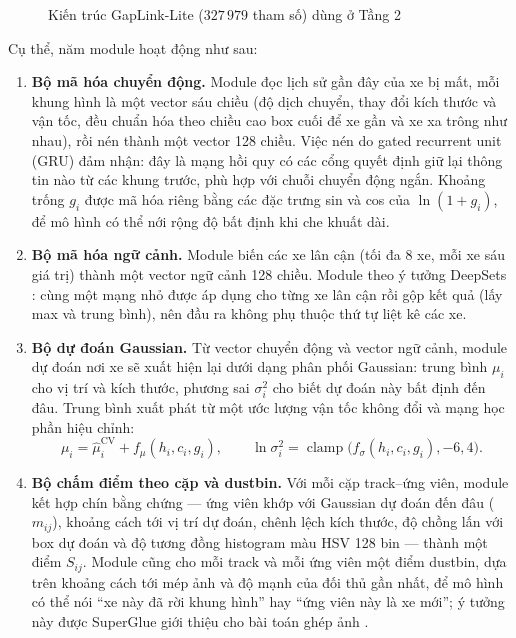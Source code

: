 \begin{figure}[H]
{%
    }
    \caption{Kiến trúc GapLink-Lite ($327\,979$ tham số) dùng ở Tầng 2}
    \label{fig:model_arch}
\end{figure}

Cụ thể, năm module hoạt động như sau:
\begin{enumerate}
    \item \textbf{Bộ mã hóa chuyển động.} Module đọc lịch sử gần đây của xe bị mất, mỗi khung hình là một vector sáu chiều (độ dịch chuyển, thay đổi kích thước và vận tốc, đều chuẩn hóa theo chiều cao box cuối để xe gần và xe xa trông như nhau), rồi nén thành một vector 128 chiều. Việc nén do gated recurrent unit (GRU) \cite{cho2014gru} đảm nhận: đây là mạng hồi quy có các cổng quyết định giữ lại thông tin nào từ các khung trước, phù hợp với chuỗi chuyển động ngắn. Khoảng trống $g_i$ được mã hóa riêng bằng các đặc trưng sin và cos của $\ln(1+g_i)$, để mô hình có thể nới rộng độ bất định khi che khuất dài.
    \item \textbf{Bộ mã hóa ngữ cảnh.} Module biến các xe lân cận (tối đa $8$ xe, mỗi xe sáu giá trị) thành một vector ngữ cảnh 128 chiều. Module theo ý tưởng DeepSets \cite{zaheer2017deepsets}: cùng một mạng nhỏ được áp dụng cho từng xe lân cận rồi gộp kết quả (lấy max và trung bình), nên đầu ra không phụ thuộc thứ tự liệt kê các xe.
    \item \textbf{Bộ dự đoán Gaussian.} Từ vector chuyển động và vector ngữ cảnh, module dự đoán nơi xe sẽ xuất hiện lại dưới dạng phân phối Gaussian: trung bình $\mu_i$ cho vị trí và kích thước, phương sai $\sigma_i^2$ cho biết dự đoán này bất định đến đâu. Trung bình xuất phát từ một ước lượng vận tốc không đổi và mạng học phần hiệu chỉnh:
    \begin{equation}
        \mu_i = \hat{\mu}^{\text{CV}}_i + f_{\mu}(h_i, c_i, g_i), \qquad \ln \sigma_i^2 = \operatorname{clamp}\big(f_{\sigma}(h_i, c_i, g_i), -6, 4\big).
    \end{equation}
    \item \textbf{Bộ chấm điểm theo cặp và dustbin.} Với mỗi cặp track--ứng viên, module kết hợp chín bằng chứng --- ứng viên khớp với Gaussian dự đoán đến đâu ($m_{ij}$), khoảng cách tới vị trí dự đoán, chênh lệch kích thước, độ chồng lấn với box dự đoán và độ tương đồng histogram màu HSV 128 bin --- thành một điểm $S_{ij}$. Module cũng cho mỗi track và mỗi ứng viên một điểm dustbin, dựa trên khoảng cách tới mép ảnh và độ mạnh của đối thủ gần nhất, để mô hình có thể nói ``xe này đã rời khung hình'' hay ``ứng viên này là xe mới''; ý tưởng này được SuperGlue giới thiệu cho bài toán ghép ảnh \cite{sarlin2020superglue}.

\end{enumerate}
